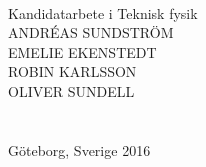 


\begin{titlepage}
			
\addtolength{\voffset}{2cm}

\begin{figure}[h!]
\centering
\vspace{2cm}	%
\end{figure}

\mbox{}
\vfill
\renewcommand{\familydefault}{\sfdefault} \normalfont %

\begin{flushleft}
\textbf{{\Huge \titel }} 	\\[0.5cm]
{\Large \undertitel }       \setlength{\parskip}{0.5cm}

Kandidatarbete i Teknisk fysik \\[1cm]

{\Large 
ANDRÉAS SUNDSTRÖM \\
EMELIE EKENSTEDT \\
ROBIN KARLSSON \\
OLIVER SUNDELL
} 
\\[2.cm]

\institution \\
\textsc{\skola} \\
Göteborg, Sverige 2016
\end{flushleft}

\renewcommand{\familydefault}{\rmdefault} \normalfont %
\end{titlepage}


\newpage
\restoregeometry
\thispagestyle{empty}
\mbox{}


